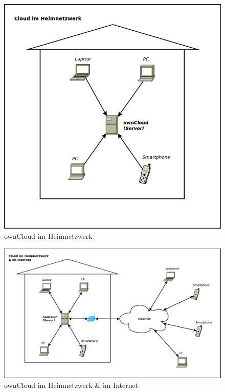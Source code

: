 \begin{figure}[H]
\centering
\includegraphics[scale=0.45]{images/owncloud_homenetwork}
\caption{ownCloud im Heimnetzwerk}
\end{figure}

\begin{figure}[H]
\centering
\includegraphics[scale=0.45]{images/owncloud_widenetwork}
\caption{ownCloud im Heimnetzwerk \& im Internet}
\end{figure}

\newpage
